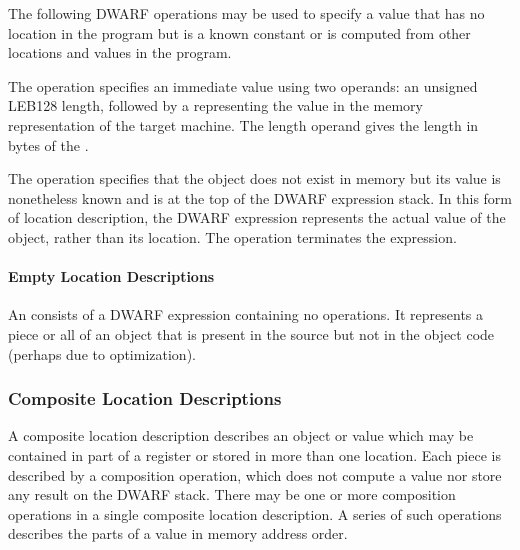 The following DWARF operations may be used to specify a value
that has no location in the program but is a known constant
or is computed from other locations and values in the program.
\begin{enumerate}[1. ]
The  operation specifies an immediate value
using two operands: an unsigned LEB128 length, followed by
a  representing the value in the memory representation
of the target machine. The length operand gives the length
in bytes of the .

The  operation specifies that the object
does not exist in memory but its value is nonetheless known
and is at the top of the DWARF expression stack. In this form
of location description, the DWARF expression represents the
actual value of the object, rather than its location. The
 operation terminates the expression.
\end{enumerate}


\paragraph{Empty Location Descriptions}

An 
consists of a DWARF expression
containing no operations. It represents a piece or all of an
object that is present in the source but not in the object code
(perhaps due to optimization).

\subsubsection{Composite Location Descriptions}
A composite location description describes an object or
value which may be contained in part of a register or stored
in more than one location. Each piece is described by a
composition operation, which does not compute a value nor
store any result on the DWARF stack. There may be one or
more composition operations in a single composite location
description. A series of such operations describes the parts
of a value in memory address order.

